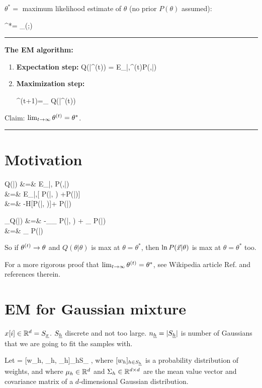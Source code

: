 $\theta^*=$ maximum likelihood
estimate of $\theta$ (no prior $P(\theta)$
assumed):

\beq
\theta^*=
\argmax_\theta\call(\theta;\vecx)
\eeq

\hrule\noindent
{\bf The EM algorithm:}
\begin{enumerate}
\item{\bf Expectation step:} 
\beq
Q(\theta|\theta^{(t)})
=
E_{\vech|\vecx,\theta^{(t)}}\ln P(\vecx,\vech|\theta)
\eeq

\item{\bf Maximization step:}

\beq
\theta^{(t+1)}=\argmax_\theta
Q(\theta|\theta^{(t)})
\eeq
\end{enumerate}
Claim: $\lim_{t\rightarrow \infty}
\theta^{(t)}=\theta^*$.

\;
\hrule
\section*{Motivation}

\beqa
Q(\theta|\theta)
&=&
E_{\vech|\vecx,\theta}
\ln P(\vecx,\vech|\theta)
\\
&=&
E_{\vech|\vecx,\theta}[
\ln P(\vech|\vecx, \theta) 
+\ln P(\vecx|\theta)]
\\
&=&
-H[P(\ul{\vech}|\vecx, \theta)]+
\ln P(\vecx|\theta)
\eeqa

\beqa
\partial_\theta Q(\theta|\theta)
&=&
-\sum_{\vech}\partial_\theta
P(\ul{\vech}|\vecx, \theta)
+
\partial_\theta
\ln P(\vecx|\theta)
\\
&=&
\partial_\theta
\ln P(\vecx|\theta)
\eeqa

So if $\theta^{(t)}\rightarrow \theta$
and $Q(\theta|\theta)$ is max at $\theta=\theta^*$,
then $\ln P({\vec{x}}|\theta)$
is max at $\theta=\theta^*$ too.

For a  more rigorous proof
that $\lim_{t\rightarrow \infty}\theta^{(t)}
=\theta^*$,
see Wikipedia article Ref.\cite{wiki-em}
and references therein.

\section*{EM for Gaussian mixture}

$x[i]\in { \mathbb{R}}^d=S_{\underline{x}}$. $S_{\underline{h}}$ discrete and
not too large. $n_{\underline{h}}=|S_{\underline{h}}|$ is
number of Gaussians that we are 
going to fit the samples with.

Let
\beq
\theta = [w_h, \mu_h, \Sigma_h]_{h\in S_\rvh}
\;,
\eeq
where
$[w_h]_{h\in S_{\underline{h}}}$ is a probability
distribution of weights, and 
where $\mu_h\in{ \mathbb{R}}^d$
and $\Sigma_h\in{ \mathbb{R}}^{d\times d}$
are the mean value vector 
and covariance matrix of
a $d$-dimensional Gaussian distribution.

